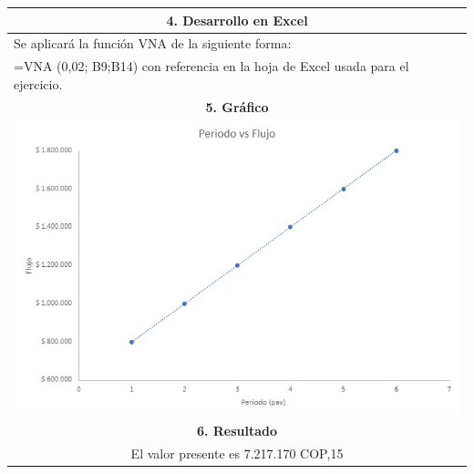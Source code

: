 \begin{center}
\begin{longtable}[H]{|p{0.5\linewidth}|p{0.5\linewidth}|}
  \multicolumn{2}{|c|}{\cellcolor[HTML]{FFB183}\textbf{4. Desarrollo en Excel}}                                                                                                                                       \\ \hline
  \multicolumn{2}{|l|}{Se aplicará la función VNA de la siguiente forma:}                                                                                                                                              \\
  \multicolumn{2}{|l|}{=VNA (0,02; B9;B14) con referencia en la hoja de Excel usada para el ejercicio.}                                                                                                                 \\ \hline
  \multicolumn{2}{|c|}{\cellcolor[HTML]{FFB183}\textbf{5. Gráfico}}                                                                                                                                                   \\ \hline
  \multicolumn{2}{|c|}{ \includegraphics[trim=-5 -5 -5 -5 ,width=0.6\columnwidth]{9/grafico9.png}}                                                                                                                     \\ \hline
  \multicolumn{2}{|c|}{\cellcolor[HTML]{FFB183}\textbf{6. Resultado}}                                                                                                                                                 \\ \hline
  \multicolumn{2}{|c|}{El valor presente es  7.217.170 COP,15}                                                                                                                                                               \\ \hline
 \end{longtable}
\end{center}